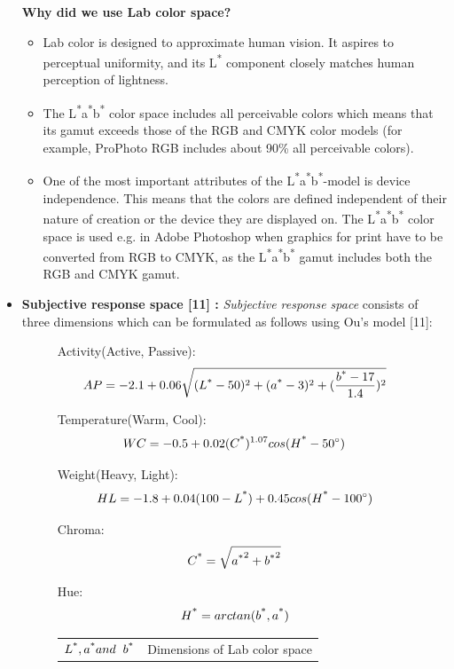 \begin{itemize}
\textbf{Why did we use Lab color space? }\\
\begin{itemize} 
\item{Lab color is designed to approximate human vision. It aspires to perceptual uniformity, and its L\textsuperscript{*} component closely matches human perception of lightness.}
\item{The L\textsuperscript{*}a\textsuperscript{*}b\textsuperscript{*} color space includes all perceivable colors which means that its gamut exceeds those of the RGB and CMYK color models (for example, ProPhoto RGB includes about 90\% all perceivable colors).}
\item{One of the most important attributes of the L\textsuperscript{*}a\textsuperscript{*}b\textsuperscript{*}-model is device independence. This means that the colors are defined independent of their nature of creation or the device they are displayed on. The L\textsuperscript{*}a\textsuperscript{*}b\textsuperscript{*} color space is used e.g. in Adobe Photoshop when graphics for print have to be converted from RGB to CMYK, as the L\textsuperscript{*}a\textsuperscript{*}b\textsuperscript{*} gamut includes both the RGB and CMYK gamut.}
\end{itemize}

\item{\textbf{Subjective response space [11] : }} \textit{Subjective response space} consists of three dimensions which can be formulated as follows using Ou's model [11]:


\begin{figure}[!htb]
Activity(Active, Passive):
\[ AP = -2.1+0.06\sqrt{(L\textsuperscript{*}-50)^{2} + (a\textsuperscript{*}-3)^{2} + (\frac{b\textsuperscript{*}-17}{1.4})^{2}} \]
\end{figure}


\begin{figure}[!htb]
Temperature(Warm, Cool):
\[ WC = -0.5+0.02(C\textsuperscript{*})^{1.07}cos(H\textsuperscript{*} - 50^{\circ} ) \]
\end{figure}  


\begin{figure}[!htb]
Weight(Heavy, Light):
\[ HL = -1.8+0.04(100-L\textsuperscript{*}) + 0.45cos(H\textsuperscript{*}-100^{\circ} ) \]
\end{figure}


\begin{figure}[!htb]
Chroma:
\[ C\textsuperscript{*} = \sqrt{a\textsuperscript{*}^2 + b\textsuperscript{*}^2}\]
\end{figure}


\begin{figure}[!htb]
\vspace{-3.5mm}
Hue:
\[ H\textsuperscript{*} = arctan(b\textsuperscript{*},a\textsuperscript{*}) \]
  \begin{tabular}{@{}>{$}l<{$}l@{}}
    L\textsuperscript{*}, a\textsuperscript{*} and  {\hspace{2mm}}  b\textsuperscript{*} & Dimensions of Lab color space\\
  \end{tabular}
\end{figure}
\end{itemize}


